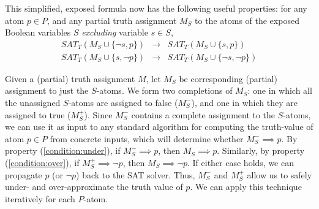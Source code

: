 \documentclass[runningheads]{llncs}
\begin{document}
This simplified, exposed formula now has the following useful properties: for any atom $p \in P$, and any partial truth assignment $M_S$ to the atoms of the exposed Boolean variables $S$ \textit{excluding} variable $s \in S$,
\begin{eqnarray}
\label{condition:under}   SAT_T (M_{S} \cup \{\lnot s, p\})  & \rightarrow  &   SAT_T (M_{S} \cup \{s, p\})\\
\label{condition:over}    SAT_T (M_{S} \cup \{s, \lnot p\})  & \rightarrow  &   SAT_T (M_{S} \cup \{\lnot s, \lnot p\})
\end{eqnarray}







Given a (partial) truth assignment $M$, let $M_S$ be corresponding (partial) assignment to just the $S$-atoms. We form two
completions of $M_S$: one in which all the unassigned $S$-atoms
are assigned to false ($M_S^-$),
and one in which they are assigned to true ($M_S^+$). Since $M_S^-$ contains
a complete assignment to the $S$-atoms, we can use it as input to any standard algorithm
for computing the truth-value of atom $p \in P$ from concrete inputs, which will determine
whether $M_S^- \implies p$. By property (\ref{condition:under}), if $M_S^-
\implies p$, then $M_S \implies p$.  Similarly,
by property (\ref{condition:over}), if
$M_S^+ \implies \lnot p$, then $M_S \implies \lnot p$. If either case holds,
we can propagate $p$ (or $\lnot p$) back to the SAT solver. Thus,
$M_S^-$ and $M_S^+$ allow us to safely under- and over-approximate the truth value of
$p$. We can apply this technique iteratively for each $P$-atom.
\end{document}
